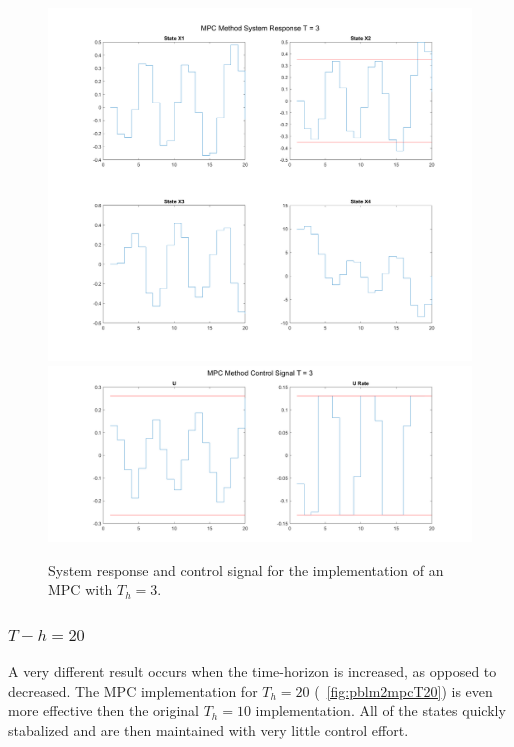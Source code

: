 \documentclass[letter]{article}
\begin{document}
\begin{figure}[p]
	\centering
	\includegraphics[width=\linewidth]{fig/pblm2_MPC_T3_sys_response}
	\includegraphics[width=\linewidth]{fig/pblm2_MPC_T3_ctrl_signal}
	\caption{System response and control signal for the implementation of an MPC with $T_h = 3$.}
	\label{fig:pblm2mpcT3}
\end{figure}

\subsubsection{$T-h = 20$}
A very different result occurs when the time-horizon is increased, as opposed to decreased. The MPC implementation for $T_h = 20$ (\figurename \ \ref{fig:pblm2mpcT20}) is even more effective then the original $T_h = 10$ implementation. All of the states quickly stabalized and are then maintained with very little control effort.
\end{document}
